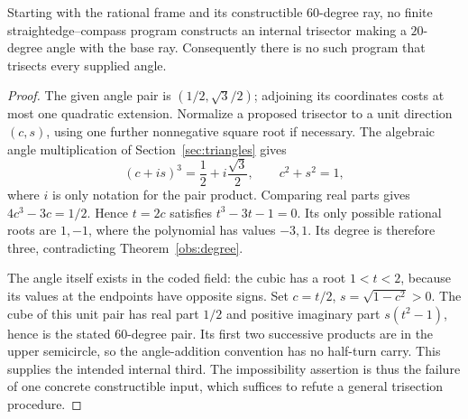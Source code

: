 \begin{theorem}
\label{obs:trisection}
Starting with the rational frame and its constructible $60$-degree ray,
no finite straightedge--compass program constructs an internal trisector
making a $20$-degree angle with the base ray.  Consequently there is no
such program that trisects every supplied angle.
\end{theorem}
\begin{proof}
The given angle pair is $(1/2,\sqrt3/2)$; adjoining its coordinates costs
at most one quadratic extension.  Normalize a proposed trisector to a
unit direction $(c,s)$, using one further nonnegative square root if
necessary.  The algebraic angle multiplication of
Section~\ref{sec:triangles} gives
\[
 (c+is)^3=\frac12+i\frac{\sqrt3}{2},\qquad
 c^2+s^2=1,
\]
where $i$ is only notation for the pair product.  Comparing real parts
gives $4c^3-3c=1/2$.  Hence $t=2c$ satisfies
$t^3-3t-1=0$.  Its only possible rational roots are $1,-1$, where the
polynomial has values $-3,1$.  Its degree is therefore three, contradicting
Theorem~\ref{obs:degree}.

The angle itself exists in the coded field: the cubic has a root
$1<t<2$, because its values at the endpoints have opposite signs.
Set $c=t/2$, $s=\sqrt{1-c^2}>0$.  The cube of this unit pair has real
part $1/2$ and positive imaginary part $s(t^2-1)$, hence is the stated
$60$-degree pair.  Its first two successive products are in the upper
semicircle, so the angle-addition convention has no half-turn carry.
This supplies the intended internal third.  The impossibility assertion
is thus the failure of one concrete constructible input, which suffices
to refute a general trisection procedure.
\end{proof}

